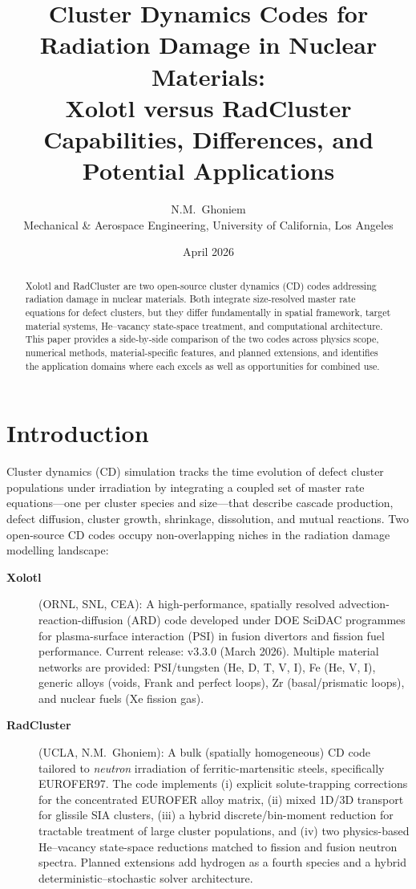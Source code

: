 \documentclass[12pt,letterpaper]{article}
\title{\textbf{Cluster Dynamics Codes for Radiation Damage in Nuclear Materials:\\
               Xolotl versus RadCluster}\\[6pt]
       \large Capabilities, Differences, and Potential Applications}
\author{N.M.\ Ghoniem\\
        Mechanical \& Aerospace Engineering,
        University of California, Los Angeles}
\date{April 2026}
\begin{document}
\maketitle

\begin{abstract}
Xolotl and RadCluster are two open-source cluster dynamics (CD) codes
addressing radiation damage in nuclear materials.  Both integrate
size-resolved master rate equations for defect clusters, but they differ
fundamentally in spatial framework, target material systems, He--vacancy
state-space treatment, and computational architecture.  This paper
provides a side-by-side comparison of the two codes across physics scope,
numerical methods, material-specific features, and planned extensions,
and identifies the application domains where each excels as well as
opportunities for combined use.
\end{abstract}

\tableofcontents
\newpage

\section{Introduction}

Cluster dynamics (CD) simulation tracks the time evolution of defect
cluster populations under irradiation by integrating a coupled set of
master rate equations---one per cluster species and size---that describe
cascade production, defect diffusion, cluster growth, shrinkage,
dissolution, and mutual reactions.  Two open-source CD codes occupy
non-overlapping niches in the radiation damage modelling landscape:

\begin{description}
  \item[\textbf{Xolotl}~\cite{Xolotl_repo}] (ORNL, SNL, CEA):
    A high-performance, spatially resolved advection-reaction-diffusion
    (ARD) code developed under DOE SciDAC programmes for plasma-surface
    interaction (PSI) in fusion divertors and fission fuel performance.
    Current release: v3.3.0 (March 2026).  Multiple material networks are
    provided: PSI/tungsten (He, D, T, V, I), Fe (He, V, I), generic alloys
    (voids, Frank and perfect loops), Zr (basal/prismatic loops), and
    nuclear fuels (Xe fission gas).

  \item[\textbf{RadCluster}~\cite{Ghoniem2026}] (UCLA, N.M.\ Ghoniem):
    A bulk (spatially homogeneous) CD code tailored to \emph{neutron}
    irradiation of ferritic-martensitic steels, specifically EUROFER97.
    The code implements (i) explicit solute-trapping corrections for the
    concentrated EUROFER alloy matrix, (ii) mixed 1D/3D transport for
    glissile SIA clusters, (iii) a hybrid discrete/bin-moment reduction
    for tractable treatment of large cluster populations, and (iv) two
    physics-based He--vacancy state-space reductions matched to fission
    and fusion neutron spectra.  Planned extensions add hydrogen as a
    fourth species and a hybrid deterministic--stochastic solver
    architecture.
\end{description}
\end{document}
